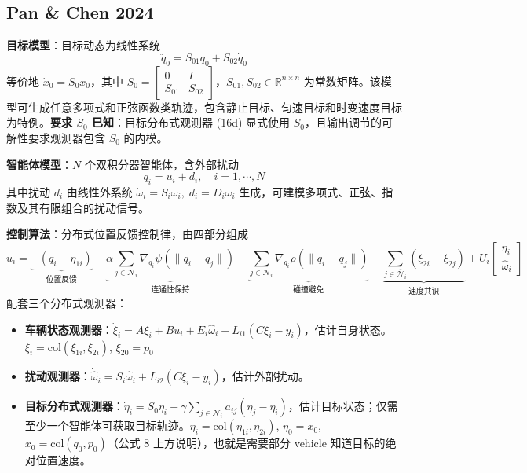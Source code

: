 \subsection{Pan \& Chen 2024}

\textbf{目标模型}：目标动态为线性系统
\[
\ddot{q}_0 = S_{01} q_0 + S_{02} \dot{q}_0
\]
等价地 $\dot{x}_0 = S_0 x_0$，其中 $S_0 = \begin{bmatrix} 0 & I \\ S_{01} & S_{02} \end{bmatrix}$，$S_{01}, S_{02} \in \mathbb{R}^{n \times n}$ 为常数矩阵。该模型可生成任意多项式和正弦函数类轨迹，包含静止目标、匀速目标和时变速度目标为特例。\textbf{要求 $S_0$ 已知}：目标分布式观测器 (16d) 显式使用 $S_0$，且输出调节的可解性要求观测器包含 $S_0$ 的内模。

\textbf{智能体模型}：$N$ 个双积分器智能体，含外部扰动
\[
\ddot{q}_i = u_i + d_i, \quad i = 1, \cdots, N
\]
其中扰动 $d_i$ 由线性外系统 $\dot{\omega}_i = S_i \omega_i,\; d_i = D_i \omega_i$ 生成，可建模多项式、正弦、指数及其有限组合的扰动信号。

\textbf{控制算法}：分布式位置反馈控制律，由四部分组成
\[
u_i = \underbrace{-(q_i - \eta_{1i})}_{\text{位置反馈}} - \underbrace{\alpha \sum_{j \in \mathcal{N}_i} \nabla_{\bar{q}_i} \psi(\|\bar{q}_i - \bar{q}_j\|)}_{\text{连通性保持}} - \underbrace{\sum_{j \in \mathcal{N}_i} \nabla_{\bar{q}_i} \rho(\|\bar{q}_i - \bar{q}_j\|)}_{\text{碰撞避免}} - \underbrace{\sum_{j \in \overline{\mathcal{N}}_i} (\xi_{2i} - \xi_{2j})}_{\text{速度共识}} + U_i \begin{bmatrix} \eta_i \\ \hat{\omega}_i \end{bmatrix}
\tag{16a}
\]
配套三个分布式观测器：
\begin{itemize}
  \item \textbf{车辆状态观测器}：$\dot{\xi}_i = A\xi_i + Bu_i + E_i\hat{\omega}_i + L_{i1}(C\xi_i - y_i)$，估计自身状态。$\xi_i=\mathrm{col}(\xi_{1i},\xi_{2i})$, $\xi_{20}=p_0$
  \item \textbf{扰动观测器}：$\dot{\hat{\omega}}_i = S_i\hat{\omega}_i + L_{i2}(C\xi_i - y_i)$，估计外部扰动。
  \item \textbf{目标分布式观测器}：$\dot{\eta}_i = S_0\eta_i + \gamma \sum_{j\in \overline{\mathcal{N}}_i} a_{ij}(\eta_j - \eta_i)$，估计目标状态；仅需至少一个智能体可获取目标轨迹。$\eta_i=\mathrm{col}(\eta_{1i},\eta_{2i})$, $\eta_0=x_0$, $x_0=\mathrm{col}(q_0,p_0)$（公式 8 上方说明），也就是需要部分 vehicle 知道目标的绝对位置速度。
\end{itemize}

